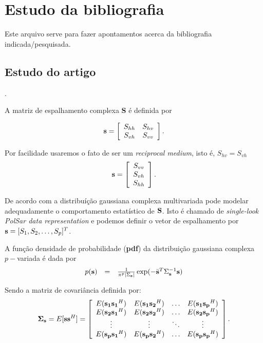 \documentclass[10pt,a4paper]{article}
\begin{document}
\section{Estudo da bibliografia}

Este arquivo serve para fazer apontamentos acerca da bibliografia indicada/pesquisada.

\subsection{Estudo do artigo  \cite{lee94}}.

A matriz de espalhamento complexa {\bf S} é definida por

$$
{\bf s} = \left[
\begin{array}{cc}
	S_{hh}   & S_{hv}   \\
	S_{vh}   & S_{vv}   \\
\end{array}
\right].
$$

Por facilidade usaremos o fato de ser um {\it reciprocal medium}, isto é, $S_{hv}=S_{vh}$
$$
{\bf s} = \left[
\begin{array}{c}
	S_{vv}      \\
	S_{vh}     \\
	S_{hh}      \\
\end{array}
\right].
$$

De acordo com \cite{goodman1963} a distribuíção gaussiana complexa multivariada pode modelar adequadamente o comportamento estatístico de $\bf S$. Isto é chamado de {\it single-look PolSar data representation} e podemos definir o vetor de espalhamento por ${\bf s}=[S_1,S_2,\dots,S_p]^T$. 

A função densidade de probabilidade ({\bf pdf}) da distribuição gaussiana complexa $p-$variada é dada por
\begin{equation}\label{sec1eqn1}
\begin{array}{ccc}
	p({\bf s})&=&\frac{1}{\pi^p|\Sigma_{{\bf s}}|}\exp(-\bar{{\bf s}}^{T}\Sigma_{{\bf s}}^{-1}{\bf s})  \\
\end{array}
\end{equation}

Sendo a matriz de covariância definida por:
\begin{equation}\label{sec1eqn2}
	{\bf \Sigma_{{\bf s}}} = E[{\bf s}{\bf s}^H] = \left[
\begin{array}{cccc}
	E({\bf s_1}{\bf s_1}^H)  & E({\bf s_1}{\bf s_2}^H) &\hdots & E({\bf s_1}{\bf s_p}^H) \\
	E({\bf s_2}{\bf s_1}^H)  & E({\bf s_2}{\bf s_2}^H) &\hdots &E({\bf s_2}{\bf s_p}^H)\\
        \vdots&\vdots &\ddots &\vdots\\
	E({\bf s_p}{\bf s_1}^H)  & E({\bf s_p}{\bf s_2}^H) &\hdots &E({\bf s_p}{\bf s_p}^H)\\
\end{array}
\right].
\end{equation}
\end{document}
